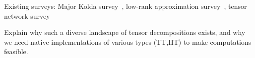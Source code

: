 Existing surveys: Major Kolda survey~\cite{Kolda:2009}, low-rank approximation survey~\cite{larskres-survey-2013}, tensor network survey~\cite{DBLP:journals/corr/Cichocki14}

Explain why such a diverse landscape of tensor decompositions exists, and why we need native implementations of various types (TT,HT) to make computations feasible.


